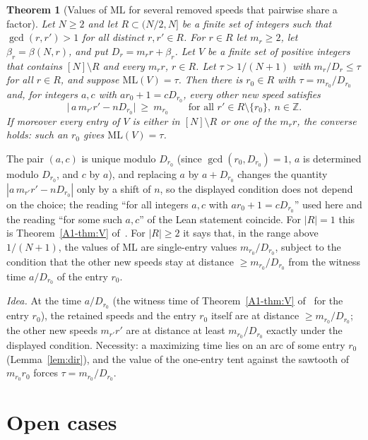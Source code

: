 \documentclass[11pt]{article}
\newtheorem{theorem}{Theorem}[section]
\theoremstyle{definition}
\theoremstyle{remark}
\newcommand{\ML}{\mathrm{ML}}
\newcommand{\ZZ}{\mathbb{Z}}
\newcommand{\xA}[1]{\ref{A1-#1}}
\begin{document}
\begin{theorem}[Values of $\ML$ for several removed speeds that pairwise share a factor]\label{thm:M}
Let $N\ge2$ and let $R\subset(N/2,N]$ be a finite set of integers such that $\gcd(r,r')>1$ for all distinct $r,r'\in R$. For $r\in R$ let $m_r\ge2$, let $\beta_r=\beta(N,r)$, and put $D_r=m_rr+\beta_r$. Let $V$ be a finite set of positive integers that contains $[N]\setminus R$ and every $m_rr$, $r\in R$. Let $\tau>1/(N+1)$ with $m_r/D_r\le\tau$ for all $r\in R$, and suppose $\ML(V)=\tau$. Then there is $r_0\in R$ with $\tau=m_{r_0}/D_{r_0}$ and, for integers $a,c$ with $ar_0+1=cD_{r_0}$, every other new speed satisfies
\[
\bigl|\,a\,m_{r'}r'-nD_{r_0}\bigr|\ \ge\ m_{r_0}\qquad\text{for all }r'\in R\setminus\{r_0\},\ n\in\ZZ.
\]
If moreover every entry of $V$ is either in $[N]\setminus R$ or one of the $m_rr$, the converse holds: such an $r_0$ gives $\ML(V)=\tau$.
\end{theorem}
The pair $(a,c)$ is unique modulo $D_{r_0}$ (since $\gcd(r_0,D_{r_0})=1$, $a$ is determined modulo $D_{r_0}$, and $c$ by $a$), and replacing $a$ by $a+D_{r_0}$ changes the quantity $|a\,m_{r'}r'-nD_{r_0}|$ only by a shift of $n$, so the displayed condition does not depend on the choice; the reading ``for all integers $a,c$ with $ar_0+1=cD_{r_0}$'' used here and the reading ``for some such $a,c$'' of the Lean statement coincide.
For $|R|=1$ this is Theorem~\xA{thm:V} of~\cite{A1}. For $|R|\ge2$ it says that, in the range above $1/(N+1)$, the values of $\ML$ are single-entry values $m_{r_0}/D_{r_0}$, subject to the condition that the other new speeds stay at distance $\ge m_{r_0}/D_{r_0}$ from the witness time $a/D_{r_0}$ of the entry $r_0$.

\emph{Idea.} At the time $a/D_{r_0}$ (the witness time of Theorem~\xA{thm:V} of~\cite{A1} for the entry $r_0$), the retained speeds and the entry $r_0$ itself are at distance $\ge m_{r_0}/D_{r_0}$; the other new speeds $m_{r'}r'$ are at distance at least $m_{r_0}/D_{r_0}$ exactly under the displayed condition. Necessity: a maximizing time lies on an arc of some entry $r_0$ (Lemma~\ref{lem:dir}), and the value of the one-entry tent against the sawtooth of $m_{r_0}r_0$ forces $\tau=m_{r_0}/D_{r_0}$.

\section{Open cases}\label{sec:open}
\end{document}
